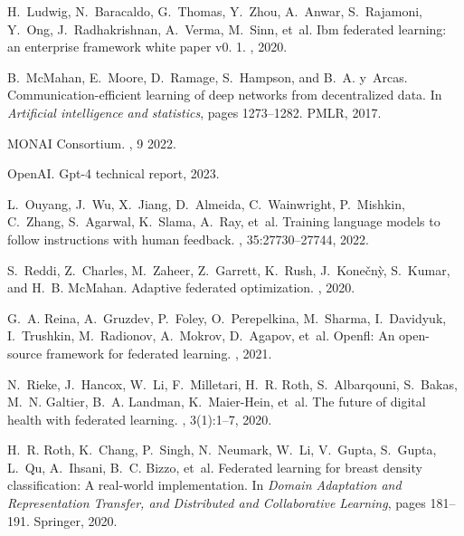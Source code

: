 \documentclass[11pt]{article}
\begin{document}
\begin{thebibliography}{10}
H.~Ludwig, N.~Baracaldo, G.~Thomas, Y.~Zhou, A.~Anwar, S.~Rajamoni, Y.~Ong,
  J.~Radhakrishnan, A.~Verma, M.~Sinn, et~al.
\newblock Ibm federated learning: an enterprise framework white paper v0. 1.
, 2020.

B.~McMahan, E.~Moore, D.~Ramage, S.~Hampson, and B.~A. y~Arcas.
\newblock Communication-efficient learning of deep networks from decentralized
  data.
\newblock In {\em Artificial intelligence and statistics}, pages 1273--1282.
  PMLR, 2017.

{MONAI Consortium}.
, 9 2022.

OpenAI.
\newblock Gpt-4 technical report, 2023.

L.~Ouyang, J.~Wu, X.~Jiang, D.~Almeida, C.~Wainwright, P.~Mishkin, C.~Zhang,
  S.~Agarwal, K.~Slama, A.~Ray, et~al.
\newblock Training language models to follow instructions with human feedback.
,
  35:27730--27744, 2022.

S.~Reddi, Z.~Charles, M.~Zaheer, Z.~Garrett, K.~Rush, J.~Kone{\v{c}}n{\`y},
  S.~Kumar, and H.~B. McMahan.
\newblock Adaptive federated optimization.
, 2020.

G.~A. Reina, A.~Gruzdev, P.~Foley, O.~Perepelkina, M.~Sharma, I.~Davidyuk,
  I.~Trushkin, M.~Radionov, A.~Mokrov, D.~Agapov, et~al.
\newblock Openfl: An open-source framework for federated learning.
, 2021.

N.~Rieke, J.~Hancox, W.~Li, F.~Milletari, H.~R. Roth, S.~Albarqouni, S.~Bakas,
  M.~N. Galtier, B.~A. Landman, K.~Maier-Hein, et~al.
\newblock The future of digital health with federated learning.
, 3(1):1--7, 2020.

H.~R. Roth, K.~Chang, P.~Singh, N.~Neumark, W.~Li, V.~Gupta, S.~Gupta, L.~Qu,
  A.~Ihsani, B.~C. Bizzo, et~al.
\newblock Federated learning for breast density classification: A real-world
  implementation.
\newblock In {\em Domain Adaptation and Representation Transfer, and
  Distributed and Collaborative Learning}, pages 181--191. Springer, 2020.


\end{thebibliography}
\end{document}
